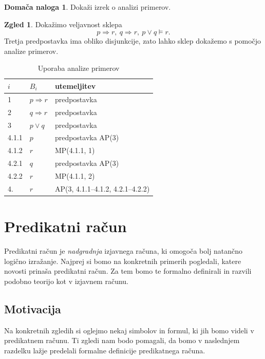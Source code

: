 \documentclass[11pt]{book}
\theoremstyle{definition}
\theoremstyle{zgled}
\newtheorem*{zgled}{Zgled}
\theoremstyle{odprtproblem}
\theoremstyle{domacanaloga}
\newtheorem*{domacanaloga}{Domača naloga}
\theoremstyle{izrek}
\begin{document}
\begin{domacanaloga}
Dokaži izrek o analizi primerov.
\end{domacanaloga}

\begin{zgled}
Dokažimo veljavnost sklepa
\[
    p \Rightarrow r, \ q \Rightarrow r, \ p \lor q \models r.
\]
Tretja predpostavka ima obliko disjunkcije, zato lahko sklep dokažemo s pomočjo analize primerov.

\begin{table}[h]
    \centering
    \begin{tabular}{lll}
        $i$ & $B_i$ & utemeljitev \\ \hline
        1 & $p \Rightarrow r$ & predpostavka \\
        2 & $q \Rightarrow r$ & predpostavka \\
        3 & $p \lor q$ & predpostavka\\
        4.1.1 & $p$ & predpostavka AP(3) \\
        4.1.2 & $r$ & MP(4.1.1, 1) \\
        4.2.1 & $q$ & predpostavka AP(3) \\
        4.2.2 & $r$ & MP(4.1.1, 2) \\
        4. & \underline{$r$} & AP(3, 4.1.1--4.1.2, 4.2.1--4.2.2)
    \end{tabular}
    \caption{Uporaba analize primerov}
\end{table}
\end{zgled}

\chapter{Predikatni račun}

Predikatni račun je \emph{nadgradnja} izjavnega računa, ki omogoča bolj natančno logično izražanje. Najprej si bomo na konkretnih primerih pogledali, katere novosti prinaša predikatni račun. Za tem bomo te formalno definirali in razvili podobno teorijo kot v izjavnem računu.

\section{Motivacija}

Na konkretnih zgledih si oglejmo nekaj simbolov in formul, ki jih bomo videli v predikatnem računu. Ti zgledi nam bodo pomagali, da bomo v naslednjem razdelku lažje predelali formalne definicije predikatnega računa.
\end{document}
